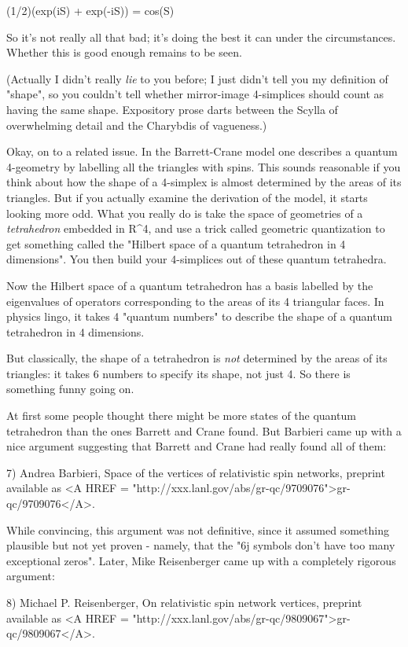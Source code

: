 (1/2)(exp(iS) + exp(-iS)) = cos(S)

So it's not really all that bad; it's doing the best it can under
the circumstances.  Whether this is good enough remains to be seen.

(Actually I didn't really \emph{lie} to you before; I just didn't tell you 
my definition of "shape", so you couldn't tell whether mirror-image
4-simplices should count as having the same shape.  Expository prose
darts between the Scylla of overwhelming detail and the Charybdis of 
vagueness.)

Okay, on to a related issue.  In the Barrett-Crane model one describes a
quantum 4-geometry by labelling all the triangles with spins.  This
sounds reasonable if you think about how the shape of a 4-simplex is
almost determined by the areas of its triangles.  But if you actually
examine the derivation of the model, it starts looking more odd.  What
you really do is take the space of geometries of a \emph{tetrahedron}
embedded in R^{4}, and use a trick called geometric quantization to get
something called the "Hilbert space of a quantum tetrahedron in 4
dimensions".   You then build your 4-simplices out of these quantum
tetrahedra.  

Now the Hilbert space of a quantum tetrahedron has a basis labelled by
the eigenvalues of operators corresponding to the areas of its 4
triangular faces.  In physics lingo, it takes 4 "quantum numbers" to
describe the shape of a quantum tetrahedron in 4 dimensions.

But classically, the shape of a tetrahedron is \emph{not} determined by the
areas of its triangles: it takes 6 numbers to specify its shape, not
just 4.  So there is something funny going on.  

At first some people thought there might be more states of the quantum 
tetrahedron than the ones Barrett and Crane found.  But Barbieri came up
with a nice argument suggesting that Barrett and Crane had really found
all of them: 

7) Andrea Barbieri, Space of the vertices of relativistic
spin networks, preprint available as 
<A HREF = "http://xxx.lanl.gov/abs/gr-qc/9709076">gr-qc/9709076</A>.

While convincing, this argument was not definitive, since it
assumed something plausible but not yet proven - namely, that the
"6j symbols don't have too many exceptional zeros".  Later, 
Mike Reisenberger came up with a completely rigorous argument:

8) Michael P. Reisenberger, On relativistic spin network vertices,
preprint available as <A HREF = "http://xxx.lanl.gov/abs/gr-qc/9809067">gr-qc/9809067</A>.


